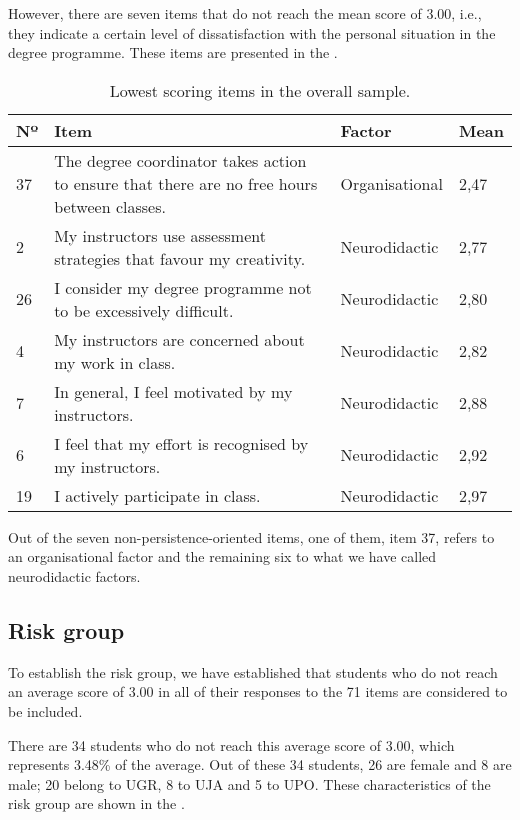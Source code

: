 \documentclass[english]{textolivre}
\begin{document}
However, there are seven items that do not reach the mean score of 3.00, i.e., they indicate a certain level of dissatisfaction with the personal situation in the degree programme. These items are presented in the .

\begin{table}[htbp]
\begin{threeparttable}
\caption{Lowest scoring items in the overall sample.}
\label{tab02}
\centering
\begin{tabular}{p{1cm} p{8cm} p{2cm} p{2cm}}
\toprule
Nº & Item & Factor & Mean \\
\midrule
37 & The degree coordinator takes action to ensure that there are no free hours between classes. & Organisational & 2,47 \\
2 & My instructors use assessment strategies that favour my creativity. & Neurodidactic & 2,77  \\
26 & I consider my degree programme not to be excessively difficult. & Neurodidactic & 2,80 \\
4 & My instructors are concerned about my work in class. & Neurodidactic & 2,82 \\
7 & In general, I feel motivated by my instructors. & Neurodidactic & 2,88 \\
6 & I feel that my effort is recognised by my instructors. & Neurodidactic & 2,92 \\
19 & I actively participate in class. & Neurodidactic & 2,97 \\
\bottomrule
\end{tabular}
\end{threeparttable}
\end{table}

Out of the seven non-persistence-oriented items, one of them, item 37, refers to an organisational factor and the remaining six to what we have called neurodidactic factors.

\subsection{Risk group}\label{sec-autores}
To establish the risk group, we have established that students who do not reach an average score of 3.00 in all of their responses to the 71 items are considered to be included.

There are 34 students who do not reach this average score of 3.00, which represents 3.48\% of the average. Out of these 34 students, 26 are female and 8 are male; 20 belong to UGR, 8 to UJA and 5 to UPO. These characteristics of the risk group are shown in the .
\end{document}
